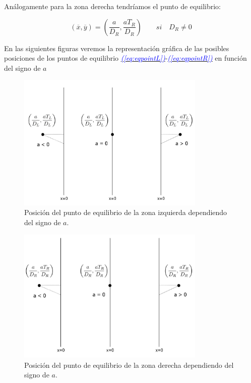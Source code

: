 \documentclass[12pt,a4paper]{report} %
\newcommand{\eref}[1]{\hyperref[#1]{\textcolor{blue}{\textit{(\ref*{#1})}}}}
\begin{document}
		\vspace{0.5cm}\noindent Análogamente para la zona derecha tendríamos el punto de equilibrio:
		
		\begin{equation}
			\label{eq:eqpointR}
			\left( \overline{x},\overline{y} \right)=\left( \frac{a}{D_R},\frac{aT_R}{D_R} \right) \qquad si \quad D_R\neq0
		\end{equation}\smallskip
		
		\vspace{0.5cm} En las siguientes figuras veremos la representación gráfica de las posibles posiciones de los puntos de equilibrio \eref{eq:eqpointL}-\eref{eq:eqpointR} en función del signo de $a$
		
		\begin{figure}[h]
			\centering
			\includegraphics[width=0.8\textwidth,center]{punto.jpg}
			\caption{Posición del punto de equilibrio de la zona izquierda dependiendo del signo de $a$.}
			\label{fig:punto}	
			\centering
		\end{figure}\smallskip
		
		\newpage
		
		\begin{figure}[h]
			\includegraphics[width=0.8\textwidth,center]{puntoR.jpg}
			\caption{Posición del punto de equilibrio de la zona derecha dependiendo del signo de $a$.}
			\label{fig:puntoR}
		\end{figure}\smallskip
		
\end{document}
